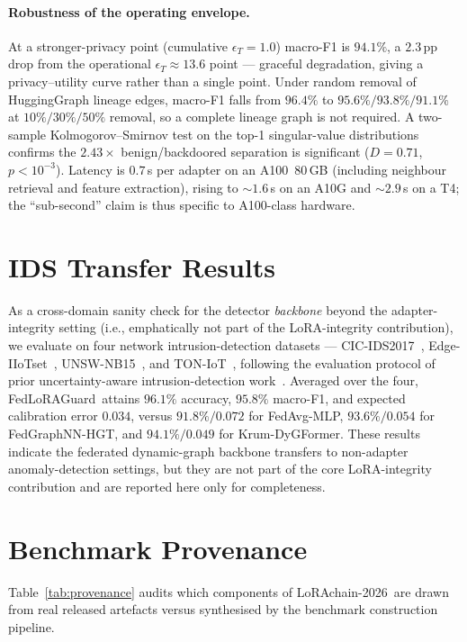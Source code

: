 \documentclass[11pt]{article}
\theoremstyle{plain}
\theoremstyle{definition}
\theoremstyle{remark}
\newcommand{\modelname}{FedLoRAGuard}
\newcommand{\benchname}{LoRAchain-2026}
\begin{document}
\paragraph{Robustness of the operating envelope.}
At a stronger-privacy point (cumulative $\epsilon_T = 1.0$) macro-F1
is $94.1\%$, a $2.3$\,pp drop from the operational $\epsilon_T
\approx 13.6$ point --- graceful degradation, giving a
privacy--utility curve rather than a single point. Under random
removal of HuggingGraph lineage edges, macro-F1 falls from
$96.4\%$ to $95.6\%/93.8\%/91.1\%$ at $10\%/30\%/50\%$ removal, so
a complete lineage graph is not required. A two-sample
Kolmogorov--Smirnov test on the top-1 singular-value distributions
confirms the $2.43\times$ benign/backdoored separation is
significant ($D=0.71$, $p<10^{-3}$). Latency is $0.7$\,s per
adapter on an A100~80\,GB (including neighbour retrieval and
feature extraction), rising to $\sim\!1.6$\,s on an A10G and
$\sim\!2.9$\,s on a T4; the ``sub-second'' claim is thus specific
to A100-class hardware.

\section{IDS Transfer Results}
\label{app:ids}

As a cross-domain sanity check for the detector \emph{backbone}
beyond the adapter-integrity setting (i.e., emphatically not part
of the LoRA-integrity contribution), we evaluate on four
network intrusion-detection datasets --- CIC-IDS2017~\cite{sharafaldin2018toward},
Edge-IIoTset~\cite{ferrag2022edge}, UNSW-NB15~\cite{moustafa2015unsw},
and TON-IoT~\cite{moustafa2021ton}, following the evaluation
protocol of prior uncertainty-aware intrusion-detection
work~\cite{anaedevha2026gp}. Averaged over the four,
\modelname\ attains $96.1\%$ accuracy, $95.8\%$ macro-F1, and
expected calibration error $0.034$, versus $91.8\%/0.072$ for
FedAvg-MLP, $93.6\%/0.054$ for FedGraphNN-HGT, and
$94.1\%/0.049$ for Krum-DyGFormer. These results indicate the
federated dynamic-graph backbone transfers to non-adapter
anomaly-detection settings, but they are not part of the core
LoRA-integrity contribution and are reported here only for
completeness.

\section{Benchmark Provenance}
\label{app:provenance}

Table~\ref{tab:provenance} audits which components of \benchname\
are drawn from real released artefacts versus synthesised by the
benchmark construction pipeline.
\end{document}

